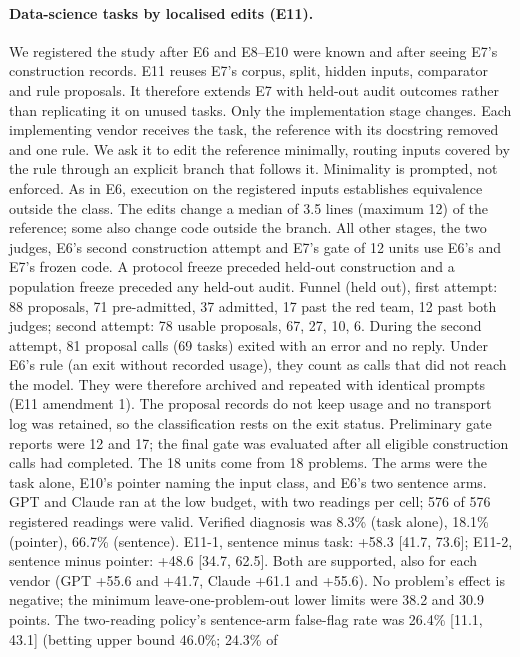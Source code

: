 \paragraph{Data-science tasks by localised edits (E11).} We registered the study after E6 and E8--E10
were known and after seeing E7's construction records. E11 reuses E7's corpus, split, hidden inputs,
comparator and rule proposals. It therefore extends E7 with held-out audit outcomes rather than
replicating it on unused tasks. Only the implementation stage changes. Each implementing vendor receives
the task, the reference with its docstring removed and one rule. We ask it to edit the reference
minimally, routing inputs covered by the rule through an explicit branch that follows it. Minimality is
prompted, not enforced. As in E6, execution on the registered inputs establishes equivalence outside the
class. The edits change a median of 3.5 lines (maximum 12) of the reference; some also change code
outside the branch. All other stages, the two judges, E6's second construction attempt and E7's gate of
12 units use E6's and E7's frozen code. A protocol freeze preceded held-out construction and a population
freeze preceded any held-out audit. Funnel (held out), first attempt: 88 proposals, 71 pre-admitted, 37
admitted, 17 past the red team, 12 past both judges; second attempt: 78 usable proposals, 67, 27, 10, 6.
During the second attempt, 81 proposal calls (69 tasks) exited with an error and no reply. Under E6's
rule (an exit without recorded usage), they count as calls that did not reach the model. They were therefore archived and
repeated with identical prompts (E11 amendment 1). The proposal records do not keep usage and no
transport log was retained, so the classification rests on the exit status. Preliminary gate reports were
12 and 17; the final gate was evaluated after all eligible construction calls had completed. The 18 units
come from 18 problems. The arms were the task alone, E10's pointer naming the input class, and E6's two
sentence arms. GPT and Claude ran at the low budget, with two readings per cell; 576 of 576 registered
readings were valid. Verified diagnosis was 8.3\% (task alone), 18.1\% (pointer), 66.7\% (sentence). E11-1,
sentence minus task: +58.3 [41.7, 73.6]; E11-2, sentence minus pointer: +48.6 [34.7, 62.5]. Both are
supported, also for each vendor (GPT +55.6 and +41.7, Claude +61.1 and +55.6). No problem's effect is
negative; the minimum leave-one-problem-out lower limits were 38.2 and 30.9 points. The two-reading
policy's sentence-arm false-flag rate was 26.4\% [11.1, 43.1] (betting upper bound 46.0\%; 24.3\% of
